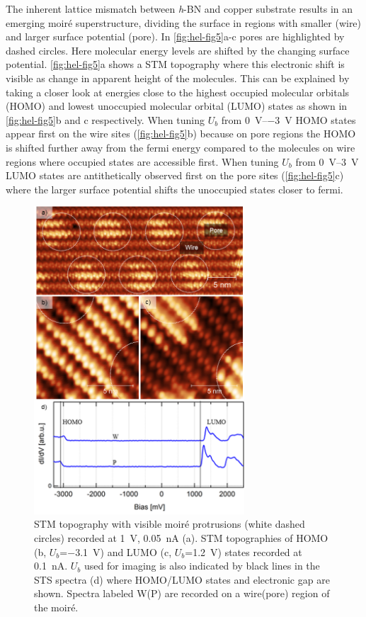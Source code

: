 The inherent lattice mismatch between \textit{h}-BN and copper substrate results in an emerging moir\'e superstructure\cite{joshi_boron_2012}, dividing the surface in regions with smaller (wire) and larger surface potential (pore)\cite{Koitz_Structural_2013}. In \autoref{fig:hel-fig5}a-c pores are highlighted by dashed circles. Here molecular energy levels are shifted by the changing surface potential.\cite{Sushobhan_Control_2014} \autoref{fig:hel-fig5}a shows a STM topography where this electronic shift is visible as change in apparent height of the molecules. This can be explained by taking a closer look at energies close to the highest occupied molecular orbitals (HOMO) and lowest unoccupied molecular orbital (LUMO) states as shown in \autoref{fig:hel-fig5}b and c respectively. When tuning $U_b$ from \SIrange{0}{-3}{\volt} HOMO states appear first on the wire sites (\autoref{fig:hel-fig5}b) because on pore regions the HOMO is shifted further away from the fermi energy compared to the molecules on wire regions where occupied states are accessible first. When tuning $U_b$ from \SIrange{0}{3}{\volt} LUMO states are antithetically observed first on the pore sites (\autoref{fig:hel-fig5}c) where the larger surface potential shifts the unoccupied states closer to fermi.

\begin{figure} \centering
	\includegraphics[width=0.7\textwidth]{./images/paper/helicene/fig5}
	\caption{STM topography with visible moir\'e protrusions (white dashed circles) recorded at \SI{1}{\volt}, \SI{0.05}{\nano \ampere} (a). STM topographies of HOMO (b, $U_b$=\SI{-3.1}{\volt}) and LUMO (c, $U_b$=\SI{1.2}{\volt}) states recorded at \SI{0.1}{\nano \ampere}. $U_b$ used for imaging is also indicated by black lines in the STS spectra (d) where HOMO/LUMO states and electronic gap are shown. Spectra labeled W(P) are recorded on a wire(pore) region of the moir\'e.}
	\label{fig:hel-fig5}
\end{figure}

